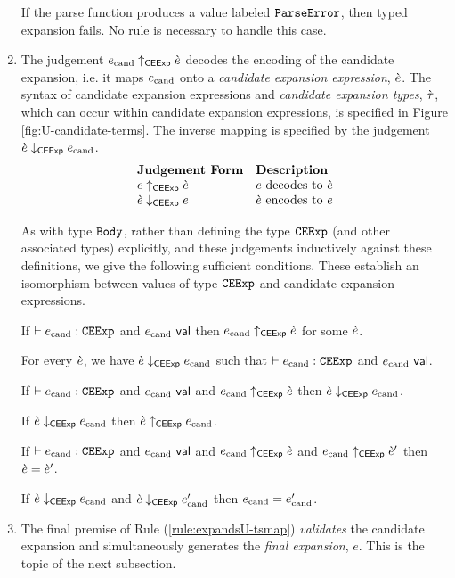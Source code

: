 \begin{enumerate}
If the parse function produces a value labeled $\mathtt{ParseError}$, then typed expansion fails. No rule is necessary to handle this case. 

\item The judgement $e_\text{cand} \uparrow_\mathsf{CEExp} \grave{e}$ decodes the encoding of the candidate expansion, i.e. it maps $e_\text{cand}$ onto a \emph{candidate expansion expression}, $\grave{e}$. The syntax of candidate expansion expressions and \emph{candidate expansion types}, $\grave{\tau}$, which can occur within candidate expansion expressions, is specified in Figure \ref{fig:U-candidate-terms}. The inverse mapping is specified by the judgement $\grave{e} \downarrow_\mathsf{CEExp} e_\text{cand}$. 
\[\begin{array}{ll}
\textbf{Judgement Form} & \textbf{Description}\\
e \uparrow_\mathsf{CEExp} \grave{e} & \text{$e$ decodes to $\grave{e}$}\\
\grave{e} \downarrow_\mathsf{CEExp} e & \text{$\grave{e}$ encodes to $e$}
\end{array}\]

As with type $\mathtt{Body}$, rather than defining the type $\mathtt{CEExp}$ (and other associated types) explicitly, and these judgements inductively against these definitions, we give  the following sufficient conditions. These establish an isomorphism between values of type $\mathtt{CEExp}$ and candidate expansion expressions.

\begin{condition} If $\vdash e_\text{cand} : \mathtt{CEExp}$ and $e_\text{cand}~\mathsf{val}$ then $e_\text{cand} \uparrow_\mathsf{CEExp} \grave{e}$ for some $\grave{e}$. \end{condition}
\begin{condition} For every $\grave{e}$, we have $\grave{e} \downarrow_\mathsf{CEExp} e_\text{cand}$ such that $\vdash e_\text{cand} : \mathtt{CEExp}$ and $e_\text{cand}~\mathsf{val}$. \end{condition}
\begin{condition} If $\vdash e_\text{cand} : \mathtt{CEExp}$ and $e_\text{cand}~\mathsf{val}$ and $e_\text{cand} \uparrow_\mathsf{CEExp} \grave{e}$ then $\grave{e} \downarrow_\mathsf{CEExp} e_\text{cand}$. \end{condition}
\begin{condition} If $\grave{e} \downarrow_\mathsf{CEExp} e_\text{cand}$ then $\grave{e} \uparrow_\mathsf{CEExp} e_\text{cand}$. \end{condition}
\begin{condition} If $\vdash e_\text{cand} : \mathtt{CEExp}$ and $e_\text{cand}~\mathsf{val}$ and $e_\text{cand} \uparrow_\mathsf{CEExp} \grave{e}$ and $e_\text{cand} \uparrow_\mathsf{CEExp} \grave{e}'$ then $\grave{e}=\grave{e}'$. \end{condition}
\begin{condition} If $\grave{e} \downarrow_\mathsf{CEExp} e_\text{cand}$ and $\grave{e} \downarrow_\mathsf{CEExp} e_\text{cand}'$ then $e_\text{cand}=e_\text{cand}'$. \end{condition}

\item The final premise of Rule (\ref{rule:expandsU-tsmap}) \emph{validates} the candidate expansion and simultaneously generates the \emph{final expansion}, $e$. This is the topic of the next subsection.
\end{enumerate}

